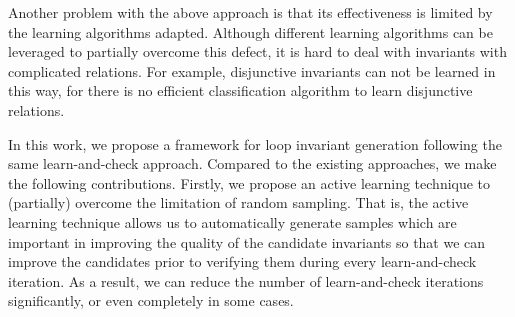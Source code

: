 Another problem with the above approach is that its effectiveness is limited by the learning algorithms adapted.
Although different learning algorithms can be leveraged to partially overcome this defect, 
it is hard to deal with invariants with complicated relations.
For example, disjunctive invariants can not be learned in this way, for there is no efficient classification algorithm to learn disjunctive relations. 


In this work, we propose a framework for loop invariant generation following the same learn-and-check approach. %
Compared to the existing approaches, we make the following contributions. 
Firstly, we propose an active learning technique to (partially) overcome the limitation of random sampling. 
That is, the active learning technique allows us to automatically generate samples which are important in improving the quality of the candidate invariants so that we can improve the candidates prior to verifying them during every learn-and-check iteration. 
As a result, we can reduce the number of learn-and-check iterations significantly, or even completely in some cases.
